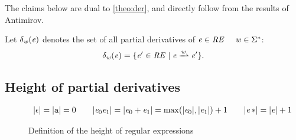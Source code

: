 The claims below are dual to \cref{theo:der}, and  directly follow from the results of Antimirov.

Let $\delta_{\mathit {w}}(\mathit {e})$ denotes the set of all partial derivatives of $\mathit {e}\in\mathit {RE}$ \wrt~ $\mathit {w}\in\Sigma^*$:
\[
 \delta_\word(\re)=\{\re'\in\reSet \mid \re\parDer{\word}\re'\}.
\]




\subsection{Height of partial derivatives}\label{sec:height}
\begin{figure}
 $$
  \begin{array}{c}
   {\mid}{\ensuremath{\mathtt {\epsilon}}}{\mid}={\mid}{\mathtt {a}}{\mid}=0                                                              \qquad
   {\mid}{\ensuremath{\mathit {e}}_0\ensuremath{\mathit {e}}_1}{\mid}={\mid}{\mathit {e}_0\mathbin{+}\mathit {e}_1}{\mid}=\max({\mid}{\mathit {e}_0}{\mid},{\mid}{\mathit {e}_1}{\mid})+1 \qquad
   {\mid}{{{\ensuremath{\mathit {e}}}\mathop{*}}}{\mid}={\mid}{\mathit {e}}{\mid}+1
  \end{array}
 $$
 \caption{Definition of the height of regular expressions}
 \label{fig:height}
\end{figure}

